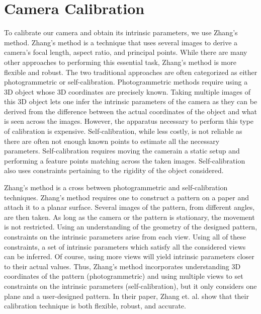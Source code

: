 \section{Camera Calibration}
\label{s:camera}

To calibrate our camera and obtain its intrinsic parameters, we use Zhang’s method. 
Zhang’s method is a technique that uses several images to derive a camera’s focal length, aspect ratio, and principal points. While there are many other approaches to performing this essential task, Zhang’s method is more flexible and robust. The two traditional approaches are often categorized as either photogrammetric or self-calibration. Photogrammetric methods require using a 3D object whose 3D coordinates are precisely known. Taking multiple images of this 3D object lets one infer the intrinsic parameters of the camera as they can be derived from the difference between the actual coordinates of the object and what is seen across the images. However, the apparatus necessary to perform this type of calibration is expensive. Self-calibration, while less costly, is not reliable as there are often not enough known points to estimate all the necessary parameters. Self-calibration requires moving the camerain a static setup and performing a feature points matching across the taken images. Self-calibration also uses constraints pertaining to the rigidity of the object considered.

Zhang’s method is a cross between photogrammetric and self-calibration techniques. Zhang’s method requires one to construct a pattern on a paper and attach it to a planar surface. Several images of the pattern, from different angles, are then taken. As long as the camera or the pattern is stationary, the movement is not restricted. Using an understanding of the geometry of the designed pattern, constraints on the intrinsic parameters arise from each view. Using all of these constraints, a set of intrinsic parameters which satisfy all the considered views can be inferred. Of course, using more views will yield intrinsic parameters closer to their actual values. Thus, Zhang’s method incorporates understanding 3D coordinates of the pattern  (photogrammetric) and using multiple views to set constraints on the intrinsic parameters (self-calibration), but it only considers one plane and a user-designed pattern. In their paper, Zhang et. al. show that their calibration technique is both flexible, robust, and accurate. 

